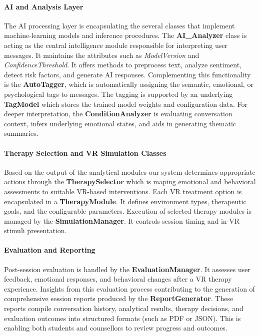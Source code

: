 \paragraph{AI and Analysis Layer}
The AI processing layer is encapsulating the several classes that implement machine-learning models and inference procedures. The \textbf{AI\_Analyzer} class is acting as the central intelligence module responsible for interpreting user messages. It maintains the attributes such as \textit{ModelVersion} and \textit{ConfidenceThreshold}. It offers methods to preprocess text, analyze sentiment, detect risk factors, and generate AI responses. Complementing this functionality is the \textbf{AutoTagger}, which is automatically assigning the semantic, emotional, or psychological tags to messages. The tagging is supported by an underlying \textbf{TagModel} which stores the trained model weights and configuration data. For deeper interpretation, the \textbf{ConditionAnalyzer} is evaluating conversation context, infers underlying emotional states, and aids in generating thematic summaries.

\paragraph{Therapy Selection and VR Simulation Classes}
Based on the output of the analytical modules our system determines appropriate actions through the \textbf{TherapySelector} which is maping emotional and behavioral assessments to suitable VR-based interventions. Each VR treatment option is encapsulated in a \textbf{TherapyModule}. It defines environment types, therapeutic goals, and the configurable parameters. Execution of selected therapy modules is managed by the \textbf{SimulationManager}. It controls session timing and in-VR stimuli presentation.

\paragraph{Evaluation and Reporting}
Post-session evaluation is handled by the \textbf{EvaluationManager}. It assesses user feedback, emotional responses, and behavioral changes after a VR therapy experience. Insights from this evaluation process contributing to the generation of comprehensive session reports produced by the \textbf{ReportGenerator}. These reports compile conversation history, analytical results, therapy decisions, and evaluation outcomes into structured formats (such as PDF or JSON). This is enabling both students and counsellors to review progress and outcomes.

